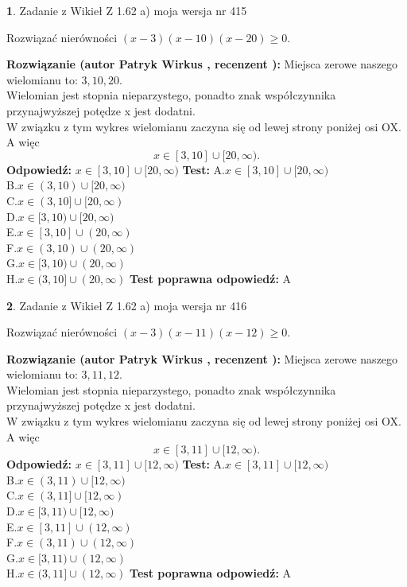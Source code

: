 \documentclass[12pt, a4paper]{article}
\theoremstyle{definition} %
\newtheorem{zad}{}
\newcommand{\zadStart}[1]{\begin{zad}#1\newline}
\newcommand{\zadStop}{\end{zad}}
\newcommand{\rozwStart}[2]{\noindent \textbf{Rozwiązanie (autor #1 , recenzent #2): }\newline}
\newcommand{\rozwStop}{\newline}
\newcommand{\odpStart}{\noindent \textbf{Odpowiedź:}\newline}
\newcommand{\odpStop}{\newline}
\newcommand{\testStart}{\noindent \textbf{Test:}\newline}
\newcommand{\testStop}{\newline}
\newcommand{\kluczStart}{\noindent \textbf{Test poprawna odpowiedź:}\newline}
\newcommand{\kluczStop}{\newline}
\begin{document}
\zadStart{Zadanie z Wikieł Z 1.62 a) moja wersja nr 415}

Rozwiązać nierówności $(x-3)(x-10)(x-20)\ge0$.
\zadStop
\rozwStart{Patryk Wirkus}{}
Miejsca zerowe naszego wielomianu to: $3, 10, 20$.\\
Wielomian jest stopnia nieparzystego, ponadto znak współczynnika przy\linebreak najwyższej potędze x jest dodatni.\\ W związku z tym wykres wielomianu zaczyna się od lewej strony poniżej osi OX. A więc $$x \in [3,10] \cup [20,\infty).$$
\rozwStop
\odpStart
$x \in [3,10] \cup [20,\infty)$
\odpStop
\testStart
A.$x \in [3,10] \cup [20,\infty)$\\
B.$x \in (3,10) \cup [20,\infty)$\\
C.$x \in (3,10] \cup [20,\infty)$\\
D.$x \in [3,10) \cup [20,\infty)$\\
E.$x \in [3,10] \cup (20,\infty)$\\
F.$x \in (3,10) \cup (20,\infty)$\\
G.$x \in [3,10) \cup (20,\infty)$\\
H.$x \in (3,10] \cup (20,\infty)$
\testStop
\kluczStart
A
\kluczStop



\zadStart{Zadanie z Wikieł Z 1.62 a) moja wersja nr 416}

Rozwiązać nierówności $(x-3)(x-11)(x-12)\ge0$.
\zadStop
\rozwStart{Patryk Wirkus}{}
Miejsca zerowe naszego wielomianu to: $3, 11, 12$.\\
Wielomian jest stopnia nieparzystego, ponadto znak współczynnika przy\linebreak najwyższej potędze x jest dodatni.\\ W związku z tym wykres wielomianu zaczyna się od lewej strony poniżej osi OX. A więc $$x \in [3,11] \cup [12,\infty).$$
\rozwStop
\odpStart
$x \in [3,11] \cup [12,\infty)$
\odpStop
\testStart
A.$x \in [3,11] \cup [12,\infty)$\\
B.$x \in (3,11) \cup [12,\infty)$\\
C.$x \in (3,11] \cup [12,\infty)$\\
D.$x \in [3,11) \cup [12,\infty)$\\
E.$x \in [3,11] \cup (12,\infty)$\\
F.$x \in (3,11) \cup (12,\infty)$\\
G.$x \in [3,11) \cup (12,\infty)$\\
H.$x \in (3,11] \cup (12,\infty)$
\testStop
\kluczStart
A
\kluczStop
\end{document}
